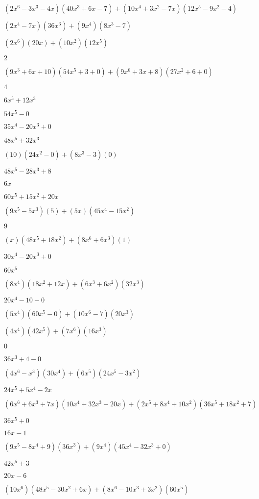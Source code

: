 \documentclass{article}
\begin{document}
\begin{multicols}{2}
$(2x^{6}-3x^{3}-4x)(40x^{3}+6x-7)+(10x^{4}+3x^2-7x)(12x^{5}-9x^{2}-4)$\item $(2x^{4}-7x)(36x^{3})+(9x^{4})(8x^{3}-7)$\item $(2x^{6})(20x)+(10x^2)(12x^{5})$\item $2$\item $(9x^{3}+6x+10)(54x^{5}+3+0)+(9x^{6}+3x+8)(27x^{2}+6+0)$\item $4$\item $6x^{5}+12x^{3}$\item $54x^{5}-0$\item $35x^{4}-20x^{3}+0$\item $48x^{5}+32x^{3}$\item $(10)(24x^{2}-0)+(8x^{3}-3)(0)$\item $48x^{5}-28x^{3}+8$\item $6x$\item $60x^{5}+15x^{2}+20x$\item $(9x^{5}-5x^{3})(5)+(5x)(45x^{4}-15x^{2})$\item $9$\item $(x)(48x^{5}+18x^{2})+(8x^{6}+6x^{3})(1)$\item $30x^{4}-20x^{3}+0$\item $60x^{5}$\item $(8x^{4})(18x^{2}+12x)+(6x^{3}+6x^2)(32x^{3})$\item $20x^{4}-10-0$\item $(5x^{4})(60x^{5}-0)+(10x^{6}-7)(20x^{3})$\item $(4x^{4})(42x^{5})+(7x^{6})(16x^{3})$\item $0$\item $36x^{3}+4-0$\item $(4x^{6}-x^{3})(30x^{4})+(6x^{5})(24x^{5}-3x^{2})$\item $24x^{5}+5x^{4}-2x$\item $(6x^{6}+6x^{3}+7x)(10x^{4}+32x^{3}+20x)+(2x^{5}+8x^{4}+10x^2)(36x^{5}+18x^{2}+7)$\item $36x^{5}+0$\item $16x-1$\item $(9x^{5}-8x^{4}+9)(36x^{3})+(9x^{4})(45x^{4}-32x^{3}+0)$\item $42x^{5}+3$\item $20x-6$\item $(10x^{6})(48x^{5}-30x^{2}+6x)+(8x^{6}-10x^{3}+3x^2)(60x^{5})$\item 
\end{multicols}
\end{document}
